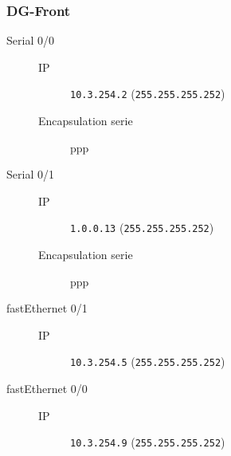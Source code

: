 \subsubsection{DG-Front}

	\begin{description}
		\item[Serial 0/0] 
		\begin{description}
			\item[IP] \texttt{10.3.254.2} (\texttt{255.255.255.252})
			\item[Encapsulation serie] ppp
		\end{description}

		\item[Serial 0/1] 
		\begin{description}
			\item[IP] \texttt{1.0.0.13} (\texttt{255.255.255.252})
			\item[Encapsulation serie] ppp
		\end{description}

		\item[fastEthernet 0/1] 
		\begin{description}
			\item[IP] \texttt{10.3.254.5} (\texttt{255.255.255.252})
		\end{description}

		\item[fastEthernet 0/0] 
		\begin{description}
			\item[IP] \texttt{10.3.254.9} (\texttt{255.255.255.252})
		\end{description}

	\end{description}
